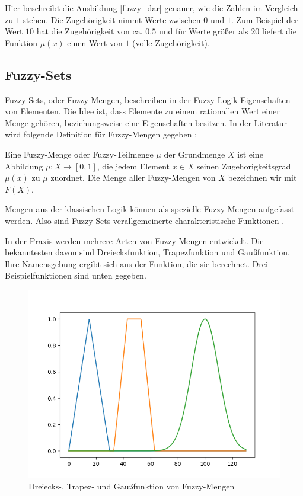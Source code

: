 Hier beschreibt die Ausbildung \ref{fuzzy_dar} genauer, wie die Zahlen im Vergleich zu $1$ stehen. Die Zugehörigkeit nimmt Werte zwischen $0$ und $1$. Zum Beispiel der Wert $10$ hat die Zugehörigkeit von ca. $0.5$ und für Werte größer als $20$ liefert die Funktion $\mu (x)$ einen Wert von $1$ (volle Zugehörigkeit).


\subsection{Fuzzy-Sets}\label{fs_section}%
Fuzzy-Sets, oder Fuzzy-Mengen, beschreiben in der Fuzzy-Logik Eigenschaften von Elementen. Die Idee ist, dass Elemente zu einem rationallen Wert einer Menge gehören, beziehungsweise eine Eigenschaften besitzen. In der Literatur wird folgende Definition für Fuzzy-Mengen gegeben \cite{CIKruse:15}:

\begin{definition}
	Eine Fuzzy-Menge oder Fuzzy-Teilmenge $\mu$ der Grundmenge $X$ ist eine
	Abbildung $\mu : X \rightarrow [0, 1]$, die jedem Element $x \in X$ seinen Zugehorigkeitsgrad $\mu(x)$ zu
	$\mu$ zuordnet. Die Menge aller Fuzzy-Mengen von $X$ bezeichnen wir mit $F(X)$. \cite{CIKruse:15}
\end{definition}

Mengen aus der klassischen Logik können als spezielle Fuzzy-Mengen aufgefasst werden. Also sind Fuzzy-Sets verallgemeinerte charakteristische Funktionen \cite{CIKruse:15}.

In der Praxis werden mehrere Arten von Fuzzy-Mengen entwickelt. Die bekanntesten davon sind Dreiecksfunktion, Trapezfunktion und Gaußfunktion. Ihre Namensgebung ergibt sich aus der Funktion, die sie berechnet. Drei Beispielfunktionen sind unten gegeben.

\begin{figure}[htbp]
	\centering
	\includegraphics[scale=0.5]{images/mf_types.png}
	\caption{Dreiecks-, Trapez- und Gaußfunktion von Fuzzy-Mengen}\label{mf_types}
\end{figure}

